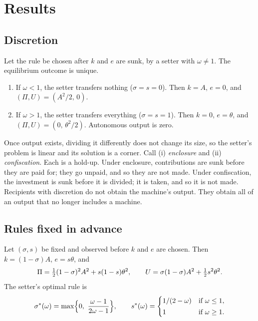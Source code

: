 \section{Results}

\subsection{Discretion}

\begin{proposition}\label{prop:disc}
Let the rule be chosen after $k$ and $e$ are sunk, by a setter with $\omega\neq 1$. The
equilibrium outcome is unique.
\begin{enumerate}[label=(\roman*)]
\item If $\omega<1$, the setter transfers nothing ($\sigma=s=0$). Then $k=A$, $e=0$, and
      $(\Pi,U)=(A^2/2,\,0)$.
\item If $\omega>1$, the setter transfers everything ($\sigma=s=1$). Then $k=0$,
      $e=\theta$, and $(\Pi,U)=(0,\,\theta^2/2)$. Autonomous output is zero.
\end{enumerate}
\end{proposition}

Once output exists, dividing it differently does not change its size, so the setter's
problem is linear and its solution is a corner. Call (i) \emph{enclosure} and (ii)
\emph{confiscation}. Each is a hold-up. Under enclosure, contributions are sunk before
they are paid for; they go unpaid, and so they are not made. Under confiscation, the
investment is sunk before it is divided; it is taken, and so it is not made. Recipients
with discretion do not obtain the machine's output. They obtain all of an output that no
longer includes a machine.

\subsection{Rules fixed in advance}

\begin{proposition}[Rules]\label{prop:rule}
Let $(\sigma,s)$ be fixed and observed before $k$ and $e$ are chosen. Then
$k=(1-\sigma)A$, $e=s\theta$, and
\begin{equation}
  \Pi=\tfrac{1}{2}(1-\sigma)^2A^2+s(1-s)\theta^2, \qquad
  U=\sigma(1-\sigma)A^2+\tfrac{1}{2} s^2\theta^2 .
\end{equation}
The setter's optimal rule is
\begin{equation}\label{eq:opt}
  \sigma^*(\omega)=\max\Bigl\{0,\ \frac{\omega-1}{2\omega-1}\Bigr\}, \qquad
  s^*(\omega)=\begin{cases} 1/(2-\omega) & \text{if } \omega\le 1,\\[2pt]
                             1 & \text{if } \omega\ge 1.\end{cases}
\end{equation}
\end{proposition}


